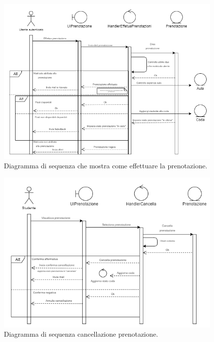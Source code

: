  \begin{figure}[H]
\begin{center}
  \includegraphics[width=1 \textwidth]{Figure/sequence prenotazione.png}
    \caption{Diagramma di sequenza che mostra come effettuare la prenotazione.}\label{figura: effettua}
\end{center}
\end{figure}


 \begin{figure}[H]
\begin{center}
  \includegraphics[width=1 \textwidth]{Figure/sequence cancella.png}
    \caption{Diagramma di sequenza cancellazione prenotazione.}\label{figura: cancella}
\end{center}
\end{figure}

